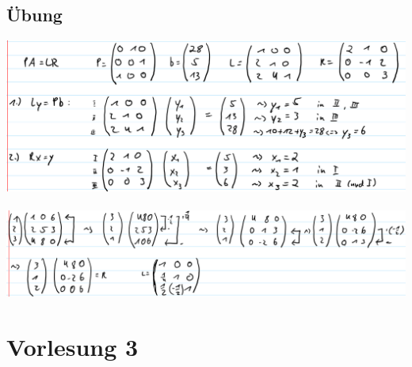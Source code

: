 \documentclass[]{article}
\begin{document}
\subsection{Übung}
	\includegraphics[width=\textwidth]{res/vl2-1.png}
	\\ \\
	\includegraphics[width=\textwidth]{res/vl2-2.png}
		

\section{Vorlesung 3}
\end{document}
